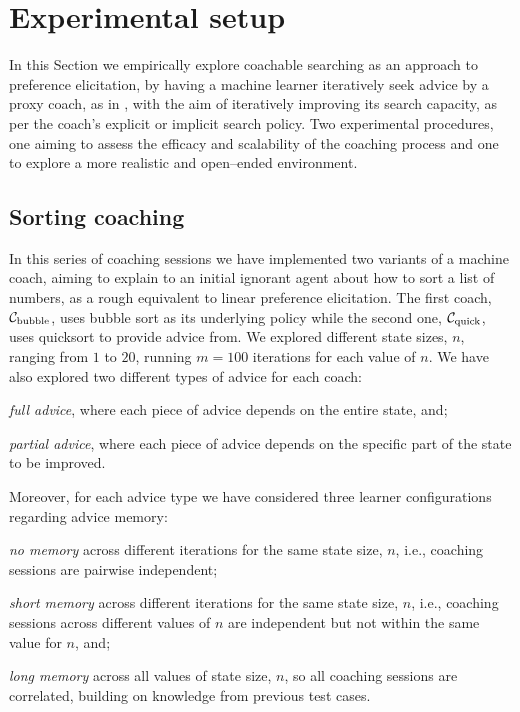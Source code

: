 \documentclass{ecai}
\newcommand{\bubblecoach}{\ensuremath{\mathcal{C}_{\rm bubble}}}
\newcommand{\quickcoach}{\ensuremath{\mathcal{C}_{\rm quick}}}
\newcommand{\ednote}[1]{\marginpar{\flushleft\tiny\sf\color{red}{#1}}}
\begin{document}
	\section{Experimental setup}\label{sec:experimental-setup}
	In this Section we empirically explore coachable searching as an approach to preference elicitation, by having a machine learner iteratively seek advice by a proxy coach, as in \cite{}, with the aim of iteratively improving its search capacity, as per the coach's explicit or implicit search policy. Two experimental procedures, one aiming to assess the efficacy and scalability of the coaching process and one to explore a more realistic and open--ended environment.\ednote{Add a few words about how coaching happens in the context of searching, i.e., how from a past sub--optimal state the coach provides a piece of advice according to their (implicit / explicit) policy that improves the state towards a(n implicit / explicit) goal.}
	\subsection{Sorting coaching}\label{subsec:sorting-coaching}
	In this series of coaching sessions we have implemented two variants of a machine coach, aiming to explain to an initial ignorant agent about how to sort a list of numbers, as a rough equivalent to linear preference elicitation. The first coach, \bubblecoach, uses bubble sort as its underlying policy while the second one, \quickcoach, uses quicksort to provide advice from. We explored different state sizes, $n$, ranging from $1$ to $20$, running $m=100$ iterations for each value of $n$. We have also explored two different types of advice for each coach:
	\begin{enumerate*}[label=(A\arabic*)]
		\item \emph{full advice}, where each piece of advice depends on the entire state, and;
		\item \emph{partial advice}, where each piece of advice depends on the specific part of the state to be improved.
	\end{enumerate*}
	Moreover, for each advice type we have considered three learner configurations regarding advice memory:
	\begin{enumerate*}[label=(C\arabic*)]
		\item \emph{no memory} across different iterations for the same state size, $n$, i.e., coaching sessions are pairwise independent;
		\item \emph{short memory} across different iterations for the same state size, $n$, i.e., coaching sessions across different values of $n$ are independent but not within the same value for $n$, and;
		\item \emph{long memory} across all values of state size, $n$, so all coaching sessions are correlated, building on knowledge from previous test cases.
	\end{enumerate*}
	
\end{document}
